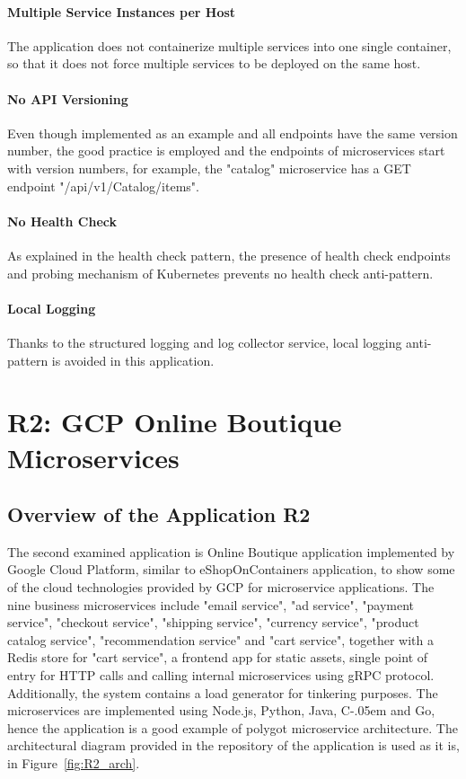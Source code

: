 \documentclass{Configuration_Files/PoliMi3i_thesis}
\newcommand{\Csharp}{%
  {\settoheight{\dimen0}{C}C\kern-.05em \resizebox{!}{\dimen0}{\raisebox{\depth}{\# }}}}
\begin{document}
\paragraph{Multiple Service Instances per Host} The application does not containerize multiple services into one single container, so that it does not force multiple services to be deployed on the same host.

\paragraph{No API Versioning} Even though implemented as an example and all endpoints have the same version number, the good practice is employed and the endpoints of microservices start with version numbers, for example, the "catalog" microservice has a GET endpoint "/api/v1/Catalog/items".

\paragraph{No Health Check} As explained in the health check pattern, the presence of health check endpoints and probing mechanism of Kubernetes prevents no health check anti-pattern.

\paragraph{Local Logging} Thanks to the structured logging and log collector service, local logging anti-pattern is avoided in this application.

\section{R2: GCP Online Boutique Microservices}
\label{sec:R2}

\subsection{Overview of the Application R2}
\label{subsec:R2_overview}

The second examined application is Online Boutique application implemented by Google Cloud Platform, similar to eShopOnContainers application, to show some of the cloud technologies provided by GCP for microservice applications.
The nine business microservices include "email service", "ad service", "payment service", "checkout service", "shipping service", "currency service", "product catalog service", "recommendation service" and "cart service", together with a Redis store for "cart service", a frontend app for static assets, single point of entry for HTTP calls and calling internal microservices using gRPC protocol.
Additionally, the system contains a load generator for tinkering purposes.
The microservices are implemented using Node.js, Python, Java, \Csharp and Go, hence the application is a good example of polygot microservice architecture.
The architectural diagram provided in the repository of the application is used as it is, in Figure~\ref{fig:R2_arch}.
\end{document}

